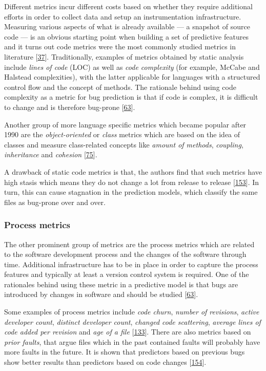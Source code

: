 \documentclass[]{book}
\begin{document}
Different metrics incur different costs based on whether they require
additional efforts in order to collect data and setup an instrumentation
infrastructure. Measuring various aspects of what is already available
--- a snapshot of source code --- is an obvious starting point when
building a set of predictive features and it turns out code metrics were
the most commonly studied metrics in literature
{[}\protect\hyperlink{ref-Catal2009review}{37}{]}. Traditionally,
examples of metrics obtained by static analysis include \emph{lines of
code} (LOC) as well as \emph{code complexity} (for example, McCabe and
Halstead complexities), with the latter applicable for languages with a
structured control flow and the concept of methods. The rationale behind
using code complexity as a metric for bug prediction is that if code is
complex, it is difficult to change and is therefore bug-prone
{[}\protect\hyperlink{ref-DAmbros2012}{63}{]}.

Another group of more language specific metrics which became popular
after 1990 are the \emph{object-oriented} or \emph{class} metrics which
are based on the idea of classes and measure class-related concepts like
\emph{amount of methods}, \emph{coupling}, \emph{inheritance} and
\emph{cohesion} {[}\protect\hyperlink{ref-Gyimothy2005}{75}{]}.

A drawback of static code metrics is that, the authors find that such
metrics have high stasis which means they do not change a lot from
release to release {[}\protect\hyperlink{ref-Rahman2013}{153}{]}. In
turn, this can cause stagnation in the prediction models, which classify
the same files as bug-prone over and over.

\subsubsection{Process metrics}\label{process-metrics}

The other prominent group of metrics are the process metrics which are
related to the software development process and the changes of the
software through time. Additional infrastructure has to be in place in
order to capture the process features and typically at least a version
control system is required. One of the rationales behind using these
metric in a predictive model is that bugs are introduced by changes in
software and should be studied
{[}\protect\hyperlink{ref-DAmbros2012}{63}{]}.

Some examples of process metrics include \emph{code churn}, \emph{number
of revisions}, \emph{active developer count}, \emph{distinct developer
count}, \emph{changed code scattering}, \emph{average lines of code
added per revision} and \emph{age of a file}
{[}\protect\hyperlink{ref-Moser2008}{133}{]}. There are also metrics
based on \emph{prior faults}, that argue files which in the past
contained faults will probably have more faults in the future. It is
shown that predictors based on previous bugs show better results than
predictors based on code changes
{[}\protect\hyperlink{ref-rahman2011}{154}{]}.
\end{document}
